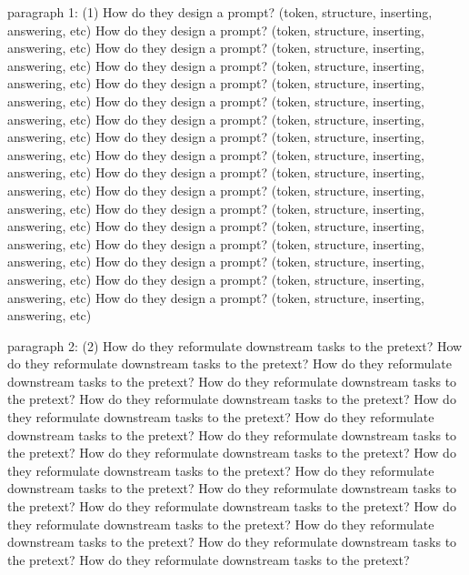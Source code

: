 paragraph 1: (1) How do they design a prompt? (token, structure, inserting, answering, etc) How do they design a prompt? (token, structure, inserting, answering, etc) How do they design a prompt? (token, structure, inserting, answering, etc) How do they design a prompt? (token, structure, inserting, answering, etc) How do they design a prompt? (token, structure, inserting, answering, etc) How do they design a prompt? (token, structure, inserting, answering, etc) How do they design a prompt? (token, structure, inserting, answering, etc) How do they design a prompt? (token, structure, inserting, answering, etc) How do they design a prompt? (token, structure, inserting, answering, etc) How do they design a prompt? (token, structure, inserting, answering, etc) How do they design a prompt? (token, structure, inserting, answering, etc)  How do they design a prompt? (token, structure, inserting, answering, etc) How do they design a prompt? (token, structure, inserting, answering, etc) How do they design a prompt? (token, structure, inserting, answering, etc) How do they design a prompt? (token, structure, inserting, answering, etc) How do they design a prompt? (token, structure, inserting, answering, etc) How do they design a prompt? (token, structure, inserting, answering, etc)

paragraph 2: (2)  How do they reformulate downstream tasks to the pretext? How do they reformulate downstream tasks to the pretext? How do they reformulate downstream tasks to the pretext? How do they reformulate downstream tasks to the pretext? How do they reformulate downstream tasks to the pretext? How do they reformulate downstream tasks to the pretext? How do they reformulate downstream tasks to the pretext? How do they reformulate downstream tasks to the pretext? How do they reformulate downstream tasks to the pretext? How do they reformulate downstream tasks to the pretext? How do they reformulate downstream tasks to the pretext? How do they reformulate downstream tasks to the pretext? How do they reformulate downstream tasks to the pretext? How do they reformulate downstream tasks to the pretext? How do they reformulate downstream tasks to the pretext? How do they reformulate downstream tasks to the pretext? How do they reformulate downstream tasks to the pretext? 

